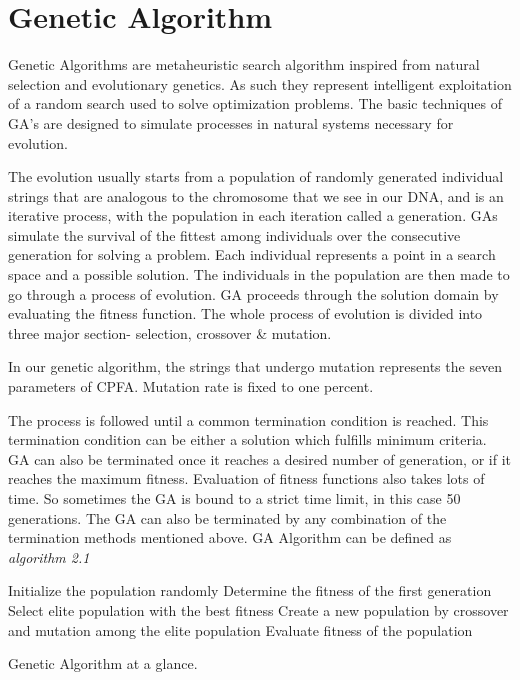 \section{\label{section:Genetic Algorithm}Genetic Algorithm}
Genetic Algorithms are metaheuristic search algorithm inspired from natural selection and evolutionary genetics. As such they represent intelligent exploitation of a random search used to solve optimization problems. The basic techniques of GA’s are designed to simulate processes in natural systems necessary for evolution.\par
The evolution usually starts from a population of randomly generated individual strings that are analogous to the chromosome that we see in our DNA, and is an iterative process, with the population in each iteration called a generation. GAs simulate the survival of the fittest among individuals over the consecutive generation for solving a problem. Each individual represents a point in a search space and a possible solution. The individuals in the population are then made to go through a process of evolution. GA proceeds through the solution domain by evaluating the fitness function. 
The whole process of evolution is divided into three major section- selection, crossover \& mutation.

In our genetic algorithm, the strings that undergo mutation represents the seven parameters of CPFA. Mutation rate is fixed to one percent. \par 
The process is followed until a common termination condition is reached. This termination condition can be either a solution which fulfills minimum criteria. GA can also be terminated once it reaches a desired number of generation, or if it reaches the maximum fitness. Evaluation of fitness functions also takes lots of time. So sometimes the GA is bound to a strict time limit, in this case 50 generations.  The GA can also be terminated by any combination of the termination methods mentioned above.
GA Algorithm can be defined as \textit{algorithm 2.1}\\
\begin{algorithm}[H]
	\begin{algorithmic}[1]
	\State Initialize the population randomly
	\State Determine the fitness of the first generation
	 		\State Select elite population with the best fitness
	 		\State Create a new population by crossover and mutation among the elite population
	 		\State Evaluate fitness of the population
		\EndWhile
		\caption{Genetic Algorithm at a glance.}
		\label{Genetic Algorithm at a glance.}
	\end{algorithmic}
\end{algorithm}
